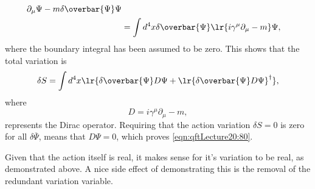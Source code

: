 {\begin{equation}
\begin{aligned}
{{      \partial_\mu \Psi
   }
   -m \delta \overbar{\Psi} \Psi
} \\
&=
\int d^4 x \delta \overbar{\Psi} \lr{ i \gamma^\mu \partial_\mu - m } \Psi,
\end{aligned}
\end{equation}
where the boundary integral has been assumed to be zero.  This shows that the total variation is
\begin{equation}\label{eqn:qftLecture20:820}
\delta S
=
\int d^4 x
\lr{
\delta
   \overbar{\Psi} D \Psi
+
   \lr{
\delta
\overbar{\Psi} D \Psi }^\dagger
},
\end{equation}
where
\begin{equation}\label{eqn:qftLecture20:840}
D = i \gamma^\mu \partial_\mu - m,
\end{equation}
represents the Dirac operator.  Requiring that the action variation \( \delta S = 0 \) is zero for all \( \delta \overbar{\Psi} \), means that \( D \Psi = 0 \), which proves \cref{eqn:qftLecture20:80}.

Given that the action itself is real, it makes sense for it's variation to be real, as demonstrated above.  A nice side effect of demonstrating this is the removal of the redundant variation variable.
} %
